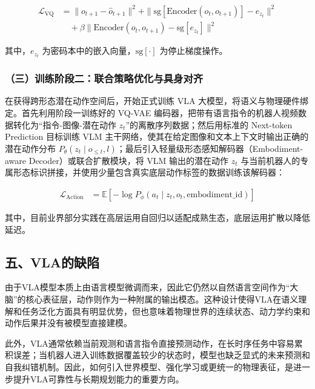 \[
\begin{aligned}
\mathcal{L}_{\mathrm{VQ}}
&= \|o_{t+1}-\hat{o}_{t+1}\|^2
+\|\mathrm{sg}[\mathrm{Encoder}(o_t,o_{t+1})]-e_{z_t}\|^2
\\
&\quad+
\beta\|\mathrm{Encoder}(o_t,o_{t+1})-\mathrm{sg}[e_{z_t}]\|^2
\end{aligned}
\]

其中，\(e_{z_t}\) 为密码本中的嵌入向量，\(\mathrm{sg}[\cdot]\) 为停止梯度操作。

\hypertarget{ux4e09ux8badux7ec3ux9636ux6bb5ux4e8cux8054ux5408ux7b56ux7565ux4f18ux5316ux4e0eux5177ux8eabux5bf9ux9f50}{%
\subsubsection{（三）训练阶段二：联合策略优化与具身对齐}\label{ux4e09ux8badux7ec3ux9636ux6bb5ux4e8cux8054ux5408ux7b56ux7565ux4f18ux5316ux4e0eux5177ux8eabux5bf9ux9f50}}

在获得跨形态潜在动作空间后，开始正式训练 VLA 大模型，将语义与物理硬件绑定。首先利用阶段一训练好的 VQ-VAE 编码器，把带有语言指令的机器人视频数据转化为``指令-图像-潜在动作 \(z_t\)''的离散序列数据；然后用标准的 Next-token Prediction 目标训练 VLM 主干网络，使其在给定图像和文本上下文时输出正确的潜在动作分布 \(P_\theta(z_t\mid o_{\le t},l)\)；最后引入轻量级形态感知解码器（Embodiment-aware Decoder）或联合扩散模块，将 VLM 输出的潜在动作 \(z_t\) 与当前机器人的专属形态标识拼接，并使用少量包含真实底层动作标签的数据训练该解码器：

\[
\begin{aligned}
\mathcal{L}_{\mathrm{Action}}
&=
\mathbb{E}\left[
-\log P_\phi(a_t\mid z_t,o_t,\mathrm{embodiment\_id})
\right]
\end{aligned}
\]

其中，目前业界部分实践在高层运用自回归以适配成熟生态，底层运用扩散以降低延迟。

\hypertarget{ux4e94vlaux7684ux7f3aux9677}{%
\subsection{五、VLA的缺陷}\label{ux4e94vlaux7684ux7f3aux9677}}

由于VLA模型本质上由语言模型微调而来，因此它仍然以自然语言空间作为``大脑''的核心表征层，动作则作为一种附属的输出模态。这种设计使得VLA在语义理解和任务泛化方面具有明显优势，但也意味着物理世界的连续状态、动力学约束和动作后果并没有被模型直接建模。

此外，VLA通常依赖当前观测和语言指令直接预测动作，在长时序任务中容易累积误差；当机器人进入训练数据覆盖较少的状态时，模型也缺乏显式的未来预测和自我纠错机制。因此，如何引入世界模型、强化学习或更统一的物理表征，是进一步提升VLA可靠性与长期规划能力的重要方向。

